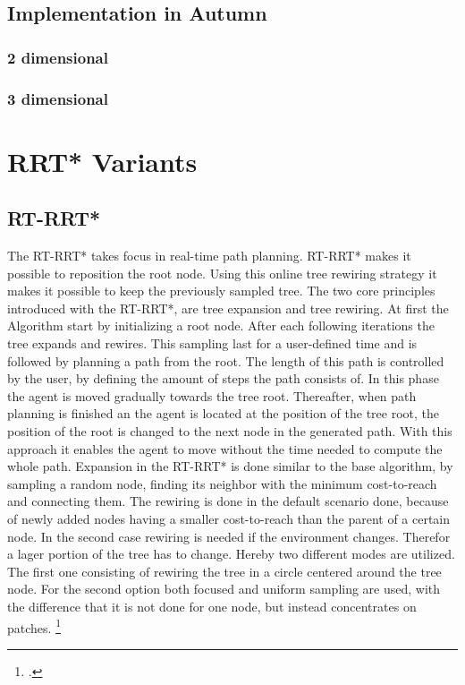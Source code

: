 \subsection{Implementation in Autumn}

\subsubsection{2 dimensional}

\subsubsection{3 dimensional}

\section{RRT* Variants}

\subsection{RT-RRT*}

The RT-RRT* takes focus in real-time path planning. RT-RRT* makes it possible to reposition the root node. Using this online tree rewiring strategy it makes it possible to keep the previously sampled tree.
The two core principles introduced with the RT-RRT*, are tree expansion and tree rewiring. 
At first the Algorithm start by initializing a root node. After each following iterations the tree expands and rewires. This sampling last for a user-defined time and is followed by planning a path from the root. The length of this path is controlled by the user, by defining the amount of steps the path consists of. In this phase the agent is moved gradually towards the tree root. Thereafter, when path planning is finished an the agent is located at the position of the tree root, the position of the root is changed to the next node in the generated path. With this approach it enables the agent to move without the time needed to compute the whole path.
Expansion in the RT-RRT* is done similar to the base algorithm, by sampling a random node, finding its neighbor with the minimum cost-to-reach and connecting them.
The rewiring is done in the default scenario done, because of newly added nodes having a smaller cost-to-reach than the parent of a certain node. In the second case rewiring is needed if the environment changes. Therefor a lager portion of the tree has to change. Hereby two different modes are utilized. The first one consisting of rewiring the tree in a circle centered around the tree node. For the second option both focused and uniform sampling are used, with the difference that it is not done for one node, but instead concentrates on patches.
\footcite{Naderi2015}

